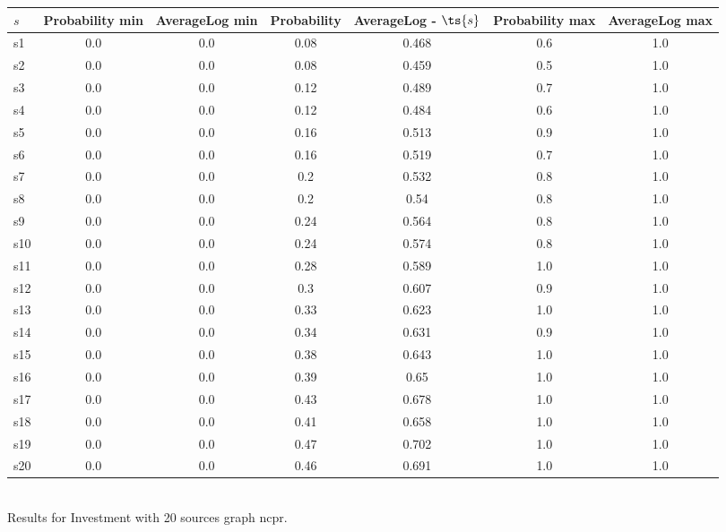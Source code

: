 \documentclass{article}
\begin{document}
\noindent\begin{tabular}{|l|c|c|c|c|c|c|}
\hline
$s$& Probability min & AverageLog min & Probability & AverageLog - $\ts{s}$ & Probability max & AverageLog max\\
\hline
s1 &0.0 & 0.0 & 0.08 & 0.468 & 0.6 & 1.0\\
\hline
s2 &0.0 & 0.0 & 0.08 & 0.459 & 0.5 & 1.0\\
\hline
s3 &0.0 & 0.0 & 0.12 & 0.489 & 0.7 & 1.0\\
\hline
s4 &0.0 & 0.0 & 0.12 & 0.484 & 0.6 & 1.0\\
\hline
s5 &0.0 & 0.0 & 0.16 & 0.513 & 0.9 & 1.0\\
\hline
s6 &0.0 & 0.0 & 0.16 & 0.519 & 0.7 & 1.0\\
\hline
s7 &0.0 & 0.0 & 0.2 & 0.532 & 0.8 & 1.0\\
\hline
s8 &0.0 & 0.0 & 0.2 & 0.54 & 0.8 & 1.0\\
\hline
s9 &0.0 & 0.0 & 0.24 & 0.564 & 0.8 & 1.0\\
\hline
s10 &0.0 & 0.0 & 0.24 & 0.574 & 0.8 & 1.0\\
\hline
s11 &0.0 & 0.0 & 0.28 & 0.589 & 1.0 & 1.0\\
\hline
s12 &0.0 & 0.0 & 0.3 & 0.607 & 0.9 & 1.0\\
\hline
s13 &0.0 & 0.0 & 0.33 & 0.623 & 1.0 & 1.0\\
\hline
s14 &0.0 & 0.0 & 0.34 & 0.631 & 0.9 & 1.0\\
\hline
s15 &0.0 & 0.0 & 0.38 & 0.643 & 1.0 & 1.0\\
\hline
s16 &0.0 & 0.0 & 0.39 & 0.65 & 1.0 & 1.0\\
\hline
s17 &0.0 & 0.0 & 0.43 & 0.678 & 1.0 & 1.0\\
\hline
s18 &0.0 & 0.0 & 0.41 & 0.658 & 1.0 & 1.0\\
\hline
s19 &0.0 & 0.0 & 0.47 & 0.702 & 1.0 & 1.0\\
\hline
s20 &0.0 & 0.0 & 0.46 & 0.691 & 1.0 & 1.0\\
\hline
\end{tabular}\\

\noindent Results for Investment with 20 sources graph ncpr.
\end{document}
